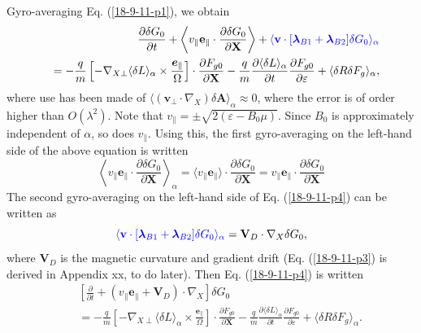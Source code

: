 \documentclass{llncs}
\newcommand{\tmcolor}[2]{{\color{#1}{#2}}}
\newcommand{\tmmathbf}[1]{\ensuremath{\boldsymbol{#1}}}
\begin{document}
Gyro-averaging Eq. (\ref{18-9-11-p1}), we obtain
\begin{eqnarray}
  &  & \frac{\partial \delta G_0}{\partial t} + \left\langle v_{\parallel}
  \mathbf{e}_{\parallel} \cdot \frac{\partial \delta G_0}{\partial \mathbf{X}}
  \right\rangle + \tmcolor{blue}{\langle \mathbf{v} \cdot
  [\tmmathbf{\lambda}_{B 1} +\tmmathbf{\lambda}_{B 2}] \delta G_0
  \rangle_{\alpha}} \nonumber\\
  &  & = - \frac{q}{m} \left[ - \nabla_{X \perp} \langle \delta L
  \rangle_{\alpha} \times \frac{\tmmathbf{e}_{\parallel}}{\Omega} \right]
  \cdot \frac{\partial F_{g 0}}{\partial \mathbf{X}} - \frac{q}{m} 
  \frac{\partial \langle \delta L \rangle_{\alpha}}{\partial t} 
  \frac{\partial F_{g 0}}{\partial \varepsilon} + \langle \delta R \delta F_g
  \rangle_{\alpha},  \label{18-9-11-p4}
\end{eqnarray}
where use has been made of $\langle (\mathbf{v}_{\perp} \cdot \nabla_X) \delta
\mathbf{A} \rangle_{\alpha} \approx 0$, where the error is of order higher
than $O (\lambda^2)$. Note that $v_{\parallel} = \pm \sqrt{2 (\varepsilon -
B_0 \mu)}$. Since $B_0$ is approximately independent of $\alpha$, so does
$v_{\parallel}$. Using this, the first gyro-averaging on the left-hand side of
the above equation is written
\begin{equation}
  \left\langle v_{\parallel} \mathbf{e}_{\parallel} \cdot \frac{\partial
  \delta G_0}{\partial \mathbf{X}} \right\rangle_{\alpha} = \langle
  v_{\parallel} \mathbf{e}_{\parallel} \rangle \cdot \frac{\partial \delta
  G_0}{\partial \mathbf{X}} = v_{\parallel} \mathbf{e}_{\parallel} \cdot
  \frac{\partial \delta G_0}{\partial \mathbf{X}}
\end{equation}
The second gyro-averaging on the left-hand side of Eq. (\ref{18-9-11-p4}) can
be written as
\begin{equation}
  \label{18-9-11-p3} \tmcolor{blue}{\langle \mathbf{v} \cdot
  [\tmmathbf{\lambda}_{B 1} +\tmmathbf{\lambda}_{B 2}] \delta G_0
  \rangle_{\alpha}} =\mathbf{V}_D \cdot \nabla_X \delta G_0,
\end{equation}
where $\mathbf{V}_D$ is the magnetic curvature and gradient drift (Eq.
(\ref{18-9-11-p3}) is derived in Appendix xx, to do later). Then Eq.
(\ref{18-9-11-p4}) is written
\begin{eqnarray}
  &  & \left[ \frac{\partial}{\partial t} + (v_{\parallel}
  \mathbf{e}_{\parallel} +\mathbf{V}_D) \cdot \nabla_X \right] \delta G_0
  \nonumber\\
  &  & = - \frac{q}{m} \left[ - \nabla_{X \perp} \langle \delta L
  \rangle_{\alpha} \times \frac{\tmmathbf{e}_{\parallel}}{\Omega} \right]
  \cdot \frac{\partial F_{g 0}}{\partial \mathbf{X}} - \frac{q}{m} 
  \frac{\partial \langle \delta L \rangle_{\alpha}}{\partial t} 
  \frac{\partial F_{g 0}}{\partial \varepsilon} + \langle \delta R \delta F_g
  \rangle_{\alpha} .  \label{17-5-5-1}
\end{eqnarray}
\end{document}

